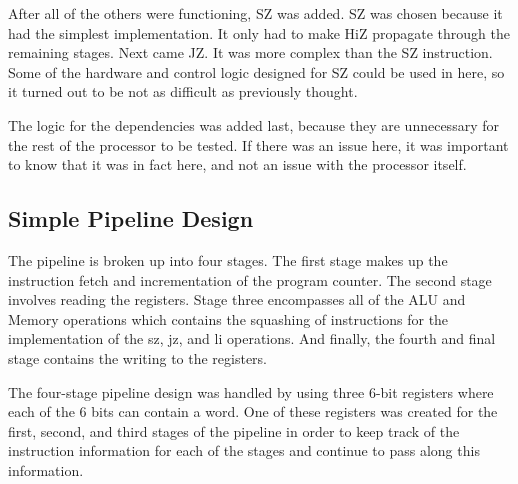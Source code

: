 \documentclass[conference]{IEEEtran}
\begin{document}
After all of the others were functioning, SZ was added. SZ was chosen because it had the simplest implementation. It only had to make HiZ propagate through the remaining stages. Next came JZ. It was more complex than the SZ instruction. Some of the hardware and control logic designed for SZ could be used in here, so it turned out to be not as difficult as previously thought. 

The logic for the dependencies was added last, because they are unnecessary for the rest of the processor to be tested. If there was an issue here, it was important to know that it was in fact here, and not an issue with the processor itself.

\subsection{Simple Pipeline Design}
The pipeline is broken up into four stages.  The first stage makes up the instruction fetch and incrementation of the program counter.  The second stage involves reading the registers.  Stage three encompasses all of the ALU and Memory operations which contains the squashing of instructions for the implementation of the sz, jz, and li operations.  And finally, the fourth and final stage contains the writing to the registers.

The four-stage pipeline design was handled by using three 6-bit registers where each of the 6 bits can contain a word.  One of these registers was created for the first, second, and third stages of the pipeline in order to keep track of the instruction information for each of the stages and continue to pass along this information.
\end{document}
